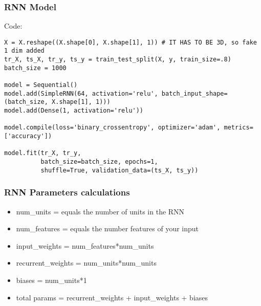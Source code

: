 \begin{frame}[fragile] \frametitle{RNN Model}
Code: 
\begin{lstlisting}
X = X.reshape((X.shape[0], X.shape[1], 1)) # IT HAS TO BE 3D, so fake 1 dim added
tr_X, ts_X, tr_y, ts_y = train_test_split(X, y, train_size=.8)
batch_size = 1000

model = Sequential()
model.add(SimpleRNN(64, activation='relu', batch_input_shape=(batch_size, X.shape[1], 1)))
model.add(Dense(1, activation='relu'))

model.compile(loss='binary_crossentropy', optimizer='adam', metrics=['accuracy'])

model.fit(tr_X, tr_y,
          batch_size=batch_size, epochs=1,
          shuffle=True, validation_data=(ts_X, ts_y))
\end{lstlisting}



\end{frame}

\begin{frame}[fragile] \frametitle{RNN Parameters calculations}

\begin{itemize}
\item num\_units = equals the number of units in the RNN
\item num\_features = equals the number features of your input
\item input\_weights = num\_features*num\_units
\item recurrent\_weights = num\_units*num\_units
\item biases = num\_units*1
\item total params = recurrent\_weights + input\_weights + biases
\end{itemize}



\end{frame}

